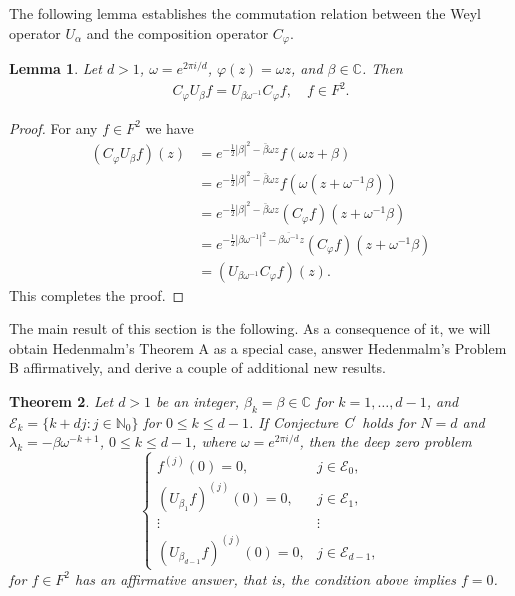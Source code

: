 \documentclass[reqno,11pt]{amsart}
\newtheorem{theorem}{Theorem}
\newtheorem{lemma}[theorem]{Lemma}
\newcommand{\C}{\mathbb C}
\newcommand{\E}{\mathcal E}
\newcommand{\N}{\mathbb N}
\begin{document}
The following lemma establishes the commutation relation between 
the Weyl operator $U_{\alpha}$ and the composition operator 
$C_{\varphi}$.

\begin{lemma}\label{l5}
Let $d>1$, $\omega=e^{2\pi i/d}$, $\varphi(z)=\omega z$, and 
$\beta\in\C$. Then
\begin{align*} 
C_{\varphi}U_{\beta}f=U_{\beta\omega^{-1}}C_{\varphi}f,\quad f\in F^2.
\end{align*}
\end{lemma}

\begin{proof}
For any $f\in F^2$ we have
\begin{align*}
(C_{\varphi}U_{\beta}f)(z)
&=e^{-\frac{1}{2}|\beta|^2-\bar{\beta}\omega z}f(\omega z+\beta) \\
&=e^{-\frac{1}{2}|\beta|^2-\bar{\beta}\omega z} 
f(\omega(z+\omega^{-1}\beta)) \\
&=e^{-\frac{1}{2}|\beta|^2-\bar{\beta} \omega z} 
(C_{\varphi}f)(z+\omega^{-1} \beta) \\
&=e^{-\frac{1}{2}|\beta\omega^{-1}|^2-\overline{\beta\omega^{-1}}z}
(C_{\varphi}f)(z+\omega^{-1} \beta) \\
&=(U_{\beta\omega^{-1}}C_{\varphi}f)(z).
\end{align*}
This completes the proof.
\end{proof}

The main result of this section is the following. As a consequence of it, 
we will obtain Hedenmalm's Theorem A as a special case, answer 
Hedenmalm's Problem B affirmatively, and derive a couple of additional 
new results.

\begin{theorem}\label{t6}
Let $d>1$ be an integer, $\beta_k=\beta\in\C$ for $k=1,\ldots,d-1$, and
$\E_k=\{k+dj: j\in\N_0\}$ for $0\le k\le d-1$. If Conjecture C$^\prime$ 
holds for $N=d$ and $\lambda_k=-\beta\omega^{-k+1}$, $0\le k\le d-1$,
where $\omega=e^{2\pi i/d}$, then the deep zero problem
\begin{equation}\label{eq2}
\begin{cases}
f^{(j)}(0)=0, &j\in\E_0,\\
(U_{\beta_1}f)^{(j)}(0)=0, &j\in\E_1,\\
\vdots & \vdots\\
(U_{\beta_{d-1}}f)^{(j)}(0)=0, &j\in\E_{d-1},\end{cases}
\end{equation}
for $f\in F^2$ has an affirmative answer, that is, the condition 
above implies $f=0$. 
\end{theorem}
\end{document}
